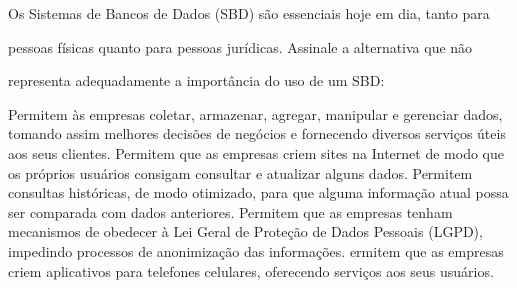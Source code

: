 \documentclass[12pt, addpoints]{exam}
\begin{document}
\begin{questions}
Os Sistemas de Bancos de Dados (SBD) são essenciais hoje em dia, tanto para

pessoas físicas quanto para pessoas jurídicas. Assinale a alternativa que não

representa adequadamente a importância do uso de um SBD:
\begin{choices}
\choice Permitem às empresas coletar, armazenar, agregar, manipular e gerenciar dados, tomando assim melhores decisões de negócios e fornecendo diversos serviços úteis aos seus clientes.
\choice Permitem que as empresas criem sites na Internet de modo que os próprios usuários consigam consultar e atualizar alguns dados.
\choice Permitem consultas históricas, de modo otimizado, para que alguma informação atual possa ser comparada com dados anteriores.
\choice Permitem que as empresas tenham mecanismos de obedecer à Lei Geral de Proteção de Dados Pessoais (LGPD), impedindo processos de anonimização das informações.
\choice ermitem que as empresas criem aplicativos para telefones celulares, oferecendo serviços aos seus usuários.
\end{choices}



    \end{questions}
    
\end{document}
